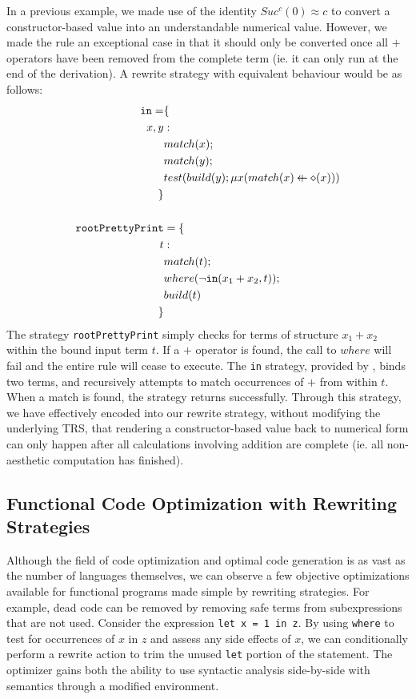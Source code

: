 \documentclass{article}
\makeatletter
\newcommand{\superimpose}[2]{{%
  \ooalign{%
    \hfil$\m@th#1\@firstoftwo#2$\hfil\cr
    \hfil$\m@th#1\@secondoftwo#2$\hfil\cr
  }%
}}
\newcommand{\leftplus}{\mathbin{\mathpalette\superimpose{{\leftarrow}{+}}}}
\makeatother
\begin{document}
In a previous example, we made use of the identity $Suc^c(0) \approx c$ to convert a constructor-based value into an understandable numerical value.
However, we made the rule an exceptional case in that it should only be converted once all $+$ operators have been removed from the complete term
(ie. it can only run at the end of the derivation). A rewrite strategy with equivalent behaviour would be as follows:
\begin{align*}
    \texttt{in} = &\{\\
        x,y&:\\
        &match(x);\\
        &match(y);\\
        &test(build(y);\mu x(match(x) \leftplus \diamond(x)))\\
        \}\\\\
    \texttt{rootPrettyPrint} &= \{\\
        t&:\\
        &match(t);\\
        &where(\lnot \texttt{in}(x_1+x_2, t));\\
        &build(t)\\
        \}
\end{align*}
The strategy \texttt{rootPrettyPrint} simply checks for terms of structure $x_1+x_2$ within the bound input term $t$. If a $+$ operator is found,
the call to $where$ will fail and the entire rule will cease to execute. The \texttt{in} strategy, provided by \cite{elco1998building},
binds two terms, and recursively attempts to match occurrences of $+$ from within $t$. When a match is found, the strategy returns successfully.
Through this strategy, we have effectively encoded into our rewrite strategy, without modifying the underlying TRS,
that rendering a constructor-based value back to numerical form
can only happen after all calculations involving addition are complete (ie. all non-aesthetic computation has finished).

\subsection{Functional Code Optimization with Rewriting Strategies}
Although the field of code optimization and optimal code generation is as vast as the number of languages themselves,
we can observe a few objective optimizations available for functional programs made simple by rewriting strategies.
For example, dead code can be removed by removing safe terms from subexpressions that are not used. Consider
the expression \texttt{let x = 1 in z}. By using \texttt{where} to test for occurrences of $x$ in $z$
and assess any side effects of $x$,
we can conditionally perform a rewrite action to trim the unused \texttt{let} portion of the statement.
The optimizer gains both the ability to use syntactic analysis side-by-side with semantics through a modified environment.
\end{document}

